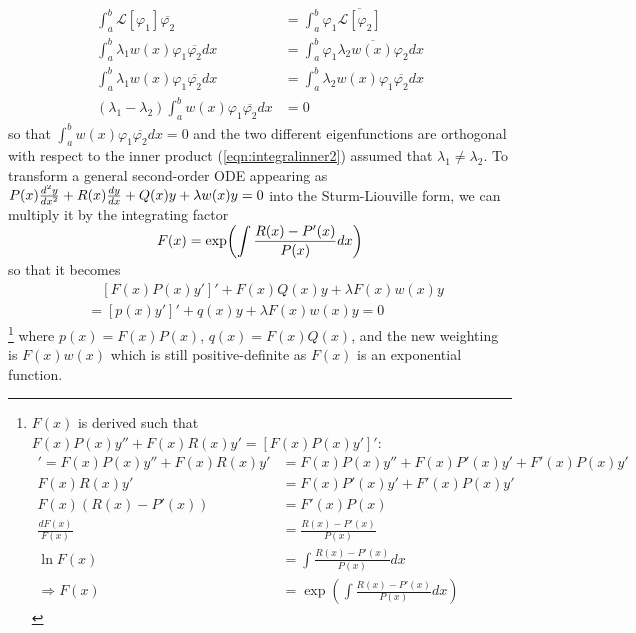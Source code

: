 \begin{align*}
\int_a^b \mathcal{L}[\varphi_1]\overline{\varphi_2} &= \int_a^b \varphi_1\overline{\mathcal{L}[\varphi_2]} \\
\int_a^b \lambda_1 w(x)\varphi_1\overline{\varphi_2} dx &= \int_a^b \varphi_1\overline{\lambda_2 w(x)\varphi_2} dx \\
\int_a^b \lambda_1 w(x)\varphi_1\overline{\varphi_2} dx &= \int_a^b \lambda_2 w(x)\varphi_1 \overline{\varphi_2} dx\\
(\lambda_1 - \lambda_2) \int_a^b w(x)\varphi_1 \overline{\varphi_2} dx &= 0
\end{align*}
so that $\int_a^b w(x)\varphi_1 \overline{\varphi_2} dx = 0$ and the two different eigenfunctions are orthogonal with respect to the inner product (\ref{eqn:integralinner2}) assumed that $\lambda_1 \neq \lambda_2$. To transform a general second-order ODE appearing as $\smash{P(x)\frac{d^2y}{dx^2} + R(x)\frac{dy}{dx}} + Q(x)y + \lambda w(x)y = 0$ into the Sturm-Liouville form, we can multiply it by the integrating factor 
\begin{align}
F(x) = \smash{\exp(\int \frac{R(x) - P'(x)}{P(x)} dx)} \label{eqn:intfactorsl}
\end{align}
so that it becomes
\begin{align}
&\quad [F(x)P(x)y']' + F(x)Q(x)y + \lambda F(x)w(x)y \nonumber \\
&= [p(x)y']' + q(x)y + \lambda F(x)w(x)y = 0
\end{align}
\footnote{$F(x)$ is derived such that $F(x)P(x)y'' + F(x)R(x)y' = [F(x)P(x)y']'$:
\begin{align*}
[F(x)P(x)y']' = F(x)P(x)y'' + F(x)R(x)y' &= F(x)P(x)y'' + F(x)P'(x)y' + F'(x)P(x)y' \\
F(x)R(x)y' &=  F(x)P'(x)y' + F'(x)P(x)y' \\
F(x)(R(x) - P'(x)) &= F'(x)P(x) \\
\frac{dF(x)}{F(x)} &= \frac{R(x) - P'(x)}{P(x)} \\
\ln F(x) &= \int \frac{R(x) - P'(x)}{P(x)} dx \\
\Rightarrow F(x) &= \exp(\int \frac{R(x) - P'(x)}{P(x)} dx)
\end{align*}}
where $p(x) = F(x)P(x)$, $q(x) = F(x)Q(x)$, and the new weighting is $F(x)w(x)$ which is still positive-definite as $F(x)$ is an exponential function.

